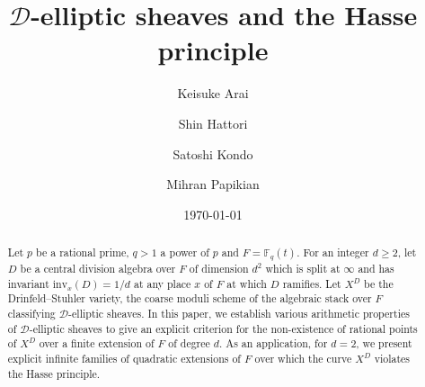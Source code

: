 \documentclass[10pt]{amsart}
\theoremstyle{plain}
\theoremstyle{definition}
\newcommand{\inv}{\mathrm{inv}}
\newcommand{\bF}{\mathbb{F}}
\newcommand{\sD}{\mathscr{D}}
\begin{document}
\title[$\sD$-elliptic sheaves and the Hasse principle]{$\sD$-elliptic sheaves and the Hasse principle}
\author[Arai]{Keisuke Arai}
\address[Keisuke Arai]{Department of Mathematics, School of Science and Technology for Future Life, Tokyo Denki University, 5 Senju Asahi-cho, Adachi-ku, Tokyo 
120-8551, Japan}

\author[Hattori]{Shin Hattori}
\address[Shin Hattori]{Department of Natural Sciences, Tokyo City University, 1-28-1 Tamazutsumi, Setagaya-ku, Tokyo 158-8557, Japan}
	
	
\author[Kondo]{Satoshi Kondo}
\address[Satoshi Kondo]{Middle East Technical University, Northern Cyprus Campus, 99738 Kalkanli, Guzelyurt, Mersin 10, Turkey}

\author[Papikian]{Mihran Papikian}
\address[Mihran Papikian]{Department of Mathematics, Pennsylvania State University, University park, PA 16802, U.S.A.}



\date{\today}


\begin{abstract}
	Let $p$ be a rational prime, $q>1$ a power of $p$ and $F=\bF_q(t)$. For an integer $d\geq 2$,
	let $D$ be a central division algebra over $F$ of dimension $d^2$ which is split at $\infty$ 
	and has invariant $\inv_x(D)=1/d$ at any place $x$ of $F$ at which $D$ ramifies. 
	Let $X^D$ be the Drinfeld--Stuhler variety, the coarse moduli scheme of the algebraic stack over $F$ classifying $\sD$-elliptic sheaves. 
	In this paper, we establish various arithmetic properties of $\sD$-elliptic sheaves to give an explicit criterion for the non-existence of rational points
	of $X^D$ over a finite extension of $F$ of degree $d$. As an application, for $d=2$, we present explicit infinite families of quadratic extensions of $F$ 
	over which
	the curve $X^D$ violates the Hasse principle.
\end{abstract}

\maketitle
\tableofcontents
\end{document}
